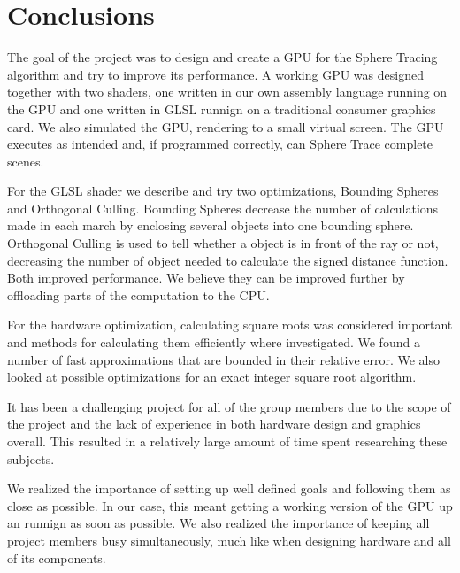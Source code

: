 \chapter{Conclusions}

	The goal of the project was to design and create a GPU for the Sphere Tracing
	algorithm and try to improve its performance. A working GPU was designed
	together with two shaders, one written in our own assembly language running
	on the GPU and one written in GLSL runnign on a traditional consumer graphics
	card. We also simulated the GPU, rendering to a small virtual screen. The GPU
	executes as intended and, if programmed correctly, can Sphere Trace complete
	scenes.
	
	For the GLSL shader we describe and try two optimizations, Bounding Spheres
	and Orthogonal Culling. Bounding Spheres decrease the number of calculations
	made in each march by enclosing several objects into one bounding sphere.
	Orthogonal Culling is used to tell whether a object is in front of the ray or
	not, decreasing the number of object needed to calculate the signed distance
	function. Both improved performance. We believe they can be improved further
	by offloading parts of the computation to the CPU.
	
	For the hardware optimization, calculating square roots was considered
	important and methods for calculating them efficiently where investigated. We
	found a number of fast approximations that are bounded in their relative
	error. We also looked at possible optimizations for an exact integer square
	root algorithm.
	
	It has been a challenging project for all of the group members due to the
	scope of the project and the lack of experience in both hardware design and
	graphics overall. This resulted in a relatively large amount of time spent
	researching these subjects.

	We realized the importance of setting up well defined goals and following
	them as close as possible. In our case, this meant getting a working version
	of the GPU up an runnign as soon as possible. We also realized the importance
	of keeping all project members busy simultaneously, much like when designing
	hardware and all of its components.
